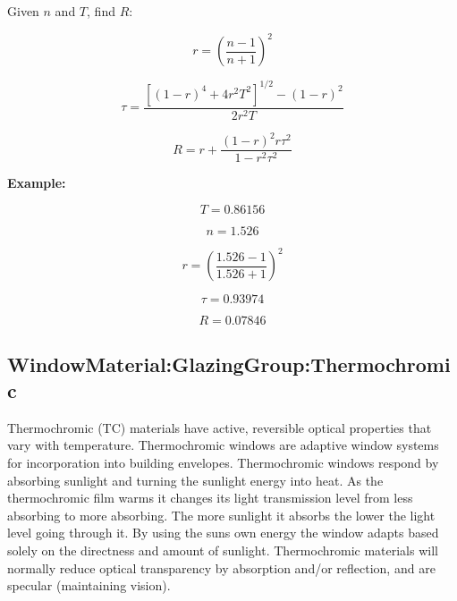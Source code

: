 Given \(n\) and \(T\), find \(R\):

\begin{equation*}
r = \left( \frac{n - 1}{n + 1} \right)^2
\end{equation*}

\begin{equation*}
\tau = \frac{ \left[ (1 - r)^4 + 4 r^2 T^2 \right]^{1/2} - (1 - r)^2}{2 r^2 T}
\end{equation*}

\begin{equation*}
R = r + \frac{(1 - r)^2 r \tau ^2}{1 - r^2 \tau ^2}
\end{equation*}

\textbf{Example:}

\begin{equation*}
T = 0.86156
\end{equation*}

\begin{equation*}
n = 1.526
\end{equation*}

\begin{equation*}
r = \left( \frac{1.526 - 1}{1.526 + 1} \right)^2
\end{equation*}

\begin{equation*}
\tau = 0.93974
\end{equation*}

\begin{equation*}
R = 0.07846
\end{equation*}

\subsection{WindowMaterial:GlazingGroup:Thermochromic}\label{windowmaterialglazinggroupthermochromic}

Thermochromic (TC) materials have active, reversible optical properties that vary with temperature. Thermochromic windows are adaptive window systems for incorporation into building envelopes. Thermochromic windows respond by absorbing sunlight and turning the sunlight energy into heat. As the thermochromic film warms it changes its light transmission level from less absorbing to more absorbing. The more sunlight it absorbs the lower the light level going through it. By using the suns own energy the window adapts based solely on the directness and amount of sunlight. Thermochromic materials will normally reduce optical transparency by absorption and/or reflection, and are specular (maintaining vision).

